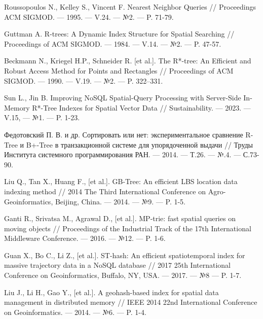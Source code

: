 %

% 


\begin{thebibliography}{9}

Roussopoulos N., Kelley S., Vincent F. Nearest Neighbor Queries // Proceedings ACM SIGMOD. --- 1995. --- V.24. --- №2. --- P. 71-79.

Guttman A. R-trees: A Dynamic Index Structure for Spatial Searching // Proceedings of ACM SIGMOD. --- 1984. --- V.14. --- №2. --- P. 47-57.

Beckmann N., Kriegel H.P., Schneider R. [et al.]. The R*-tree: An Efficient and Robust Access Method for Points and Rectangles // Proceedings of ACM SIGMOD. --- 1990. --- V.19. --- №2. --- P. 322–331.

Sun L., Jin B. Improving NoSQL Spatial-Query Processing with Server-Side In-Memory R*-Tree Indexes for Spatial Vector Data // Sustainability. --- 2023. --- V.15, --- №1. --- P. 1-23. 

Федотовский П. В. и др. Сортировать или нет: экспериментальное сравнение R-Tree и B+-Tree в транзакционной системе для упорядоченной выдачи // Труды Института системного программирования РАН. --- 2014. --- Т.26. --- №.4. --- С.73-90.


Liu Q., Tan X., Huang F., [et al.]. GB-Tree: An efficient LBS location data indexing method // 2014 The Third International Conference on Agro-Geoinformatics, Beijing, China. --- 2014. --- №9. --- P. 1-5.

Ganti R., Srivatsa M., Agrawal D., [et al.]. MP-trie: fast spatial queries on moving objects // Proceedings of the Industrial Track of the 17th International Middleware Conference. --- 2016. --- №12. --- P. 1-6.

Guan X., Bo C., Li Z., [et al.]. ST-hash: An efficient spatiotemporal index for massive trajectory data in a NoSQL database //  2017 25th International Conference on Geoinformatics, Buffalo, NY, USA. --- 2017. --- №8 --- P. 1-7.

Liu J., Li H., Gao Y., [et al.]. A geohash-based index for spatial data management in distributed memory // IEEE 2014 22nd International Conference on Geoinformatics. --- 2014. --- №6. --- P. 1-4.


\end{thebibliography}
